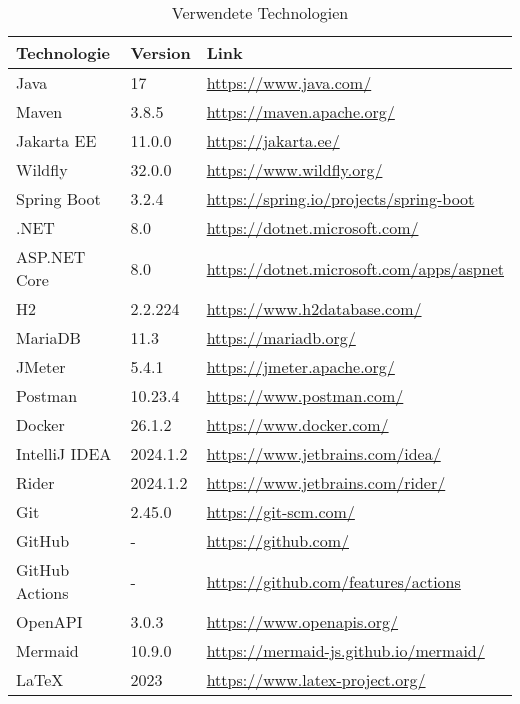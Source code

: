 \begin{table}[!h]
    \centering
    \begin{tabular}{|l|l|l|}
        \hline
        \textbf{Technologie} & \textbf{Version} & \textbf{Link} \\
        \hline
        
        Java & 17 & \url{https://www.java.com/} \\
        Maven & 3.8.5 & \url{https://maven.apache.org/} \\
        Jakarta EE & 11.0.0  & \url{https://jakarta.ee/} \\
        Wildfly & 32.0.0 & \url{https://www.wildfly.org/} \\
        Spring Boot & 3.2.4 & \url{https://spring.io/projects/spring-boot} \\
        \hline
        
        .NET & 8.0 & \url{https://dotnet.microsoft.com/} \\
        ASP.NET Core & 8.0 & \url{https://dotnet.microsoft.com/apps/aspnet} \\
        \hline
        
        H2 & 2.2.224 & \url{https://www.h2database.com/} \\
        MariaDB & 11.3 & \url{https://mariadb.org/} \\
        \hline
        
        JMeter & 5.4.1 & \url{https://jmeter.apache.org/} \\
        Postman & 10.23.4 & \url{https://www.postman.com/} \\
        \hline
        
        Docker & 26.1.2 & \url{https://www.docker.com/} \\
        IntelliJ IDEA & 2024.1.2 & \url{https://www.jetbrains.com/idea/} \\
        Rider & 2024.1.2 & \url{https://www.jetbrains.com/rider/} \\
        \hline

        Git & 2.45.0 & \url{https://git-scm.com/} \\
        GitHub & - & \url{https://github.com/} \\
        GitHub Actions & - & \url{https://github.com/features/actions} \\
        \hline

        OpenAPI & 3.0.3 & \url{https://www.openapis.org/} \\
        Mermaid & 10.9.0 & \url{https://mermaid-js.github.io/mermaid/} \\
        LaTeX & 2023 & \url{https://www.latex-project.org/} \\
        \hline
    \end{tabular}

    \caption{Verwendete Technologien}
    \label{tab:technologies}
\end{table}

